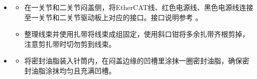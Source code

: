 \documentclass[a4paper,11pt,english,openany,oneside]{sphinxmanual}
\begin{document}
\begin{itemize}
\begin{itemize}
\begin{quote}
\begin{figure}[H]
\centering
\capstart

\noindent{}
\caption{二关节大臂凸台对齐凹槽}\label{\detokenize{_u66f4_u6362_u5173_u8282:id53}}\end{figure}
\end{quote}

\item {} 
\sphinxAtStartPar
将固定关节的外六角螺栓和垫片放入二关节的螺纹孔中，并使用开口扳手按对角顺序拧紧螺栓。扳手和螺栓的规格参考 {\hyperref[\detokenize{_u66f4_u6362_u5173_u8282:id9}]{}} 。
\begin{quote}

\begin{figure}[H]
\centering
\capstart

\noindent{}
\caption{拧紧二关节螺钉}\label{\detokenize{_u66f4_u6362_u5173_u8282:id54}}\end{figure}
\end{quote}

\end{itemize}

\item {} 
\sphinxAtStartPar
{}
\begin{itemize}
\item {} 
\sphinxAtStartPar
在一关节和二关节闷盖侧，将EtherCAT线、红色电源线、黑色电源线连接至一关节和二关节驱动板上对应的接口。接口说明参考 {\hyperref[\detokenize{_u66f4_u6362_u5173_u8282:id11}]{}} 。

\item {} 
\sphinxAtStartPar
整理线束并使用扎带将线束成组固定，使用斜口钳将多余扎带齐根剪掉，注意剪扎带时切勿剪到线束。

\end{itemize}

\item {} 
\sphinxAtStartPar
{}
\begin{itemize}
\item {} 
\sphinxAtStartPar
将密封油脂装入针筒内，在闷盖边缘的凹槽里涂抹一圈密封油脂，确保密封油脂涂抹均匀且充满凹槽。

\end{itemize}
\begin{quote}


\end{quote}
\end{itemize}
\end{document}
